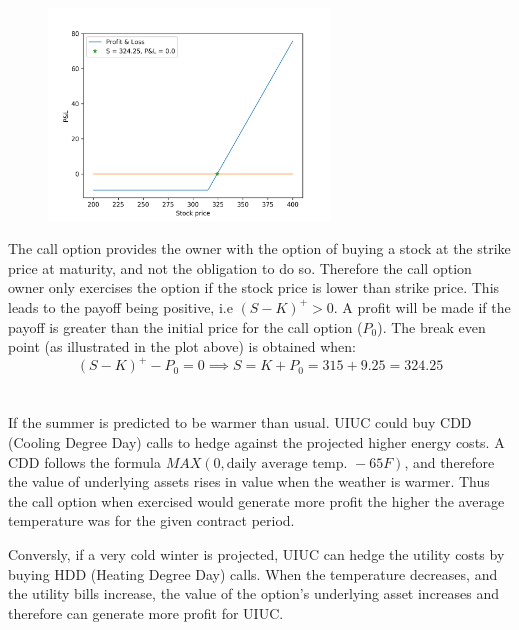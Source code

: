 \documentclass{article}
\begin{document}
\begin{figure}[H]
	\centering
	\includegraphics[width=75mm]{pl.png}
\end{figure}
The call option provides the owner with the option of buying a stock at the strike price at maturity, and not the obligation to do so. Therefore the call option owner only exercises the option if the stock price is lower than strike price. This leads to the payoff being positive, i.e $(S-K)^+ > 0$. A profit will be made if the payoff is greater than the initial price for the call option ($P_0$). The break even point (as illustrated in the plot above) is obtained when: 
$$(S-K)^+ - P_0 = 0 \implies S = K + P_0 = 315 + 9.25 = 324.25$$

\section{}

If the summer is predicted to be warmer than usual. UIUC could buy CDD (Cooling Degree Day) calls to hedge against the projected higher energy costs. A CDD follows the formula $MAX(0, \text{daily average temp. } - 65 F)$, and therefore the value of underlying assets rises in value when the weather is warmer. Thus the call option when exercised would generate more profit the higher the average temperature was for the given contract period.

Conversly, if a very cold winter is projected, UIUC can hedge the utility costs by buying HDD (Heating Degree Day) calls. When the temperature decreases, and the utility bills increase, the value of the option's underlying asset increases and therefore can generate more profit for UIUC.
\end{document}
